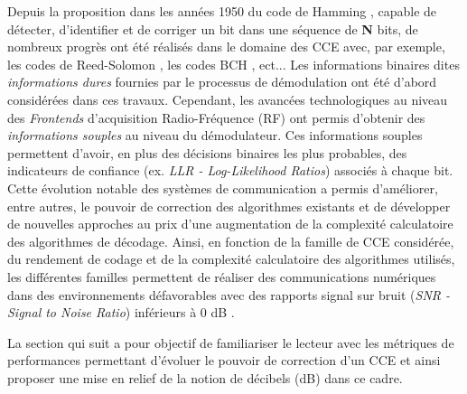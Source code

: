 \documentclass[../main.tex]{subfiles}
\begin{document}
Depuis la proposition dans les années 1950 du code de Hamming \cite{Ham50}, capable de détecter, d’identifier et de corriger un bit dans une séquence de \textbf{N} bits, de nombreux progrès ont été réalisés dans le domaine des CCE avec, par exemple, les codes de Reed-Solomon  \cite{ReedCodes}, les codes BCH  \cite{BCHCode}, ect... Les informations binaires dites \textit{informations dures} fournies par le processus de démodulation ont été d’abord considérées dans ces travaux. Cependant, les avancées technologiques au niveau des \textit{Frontends} d’acquisition Radio-Fréquence (RF) ont permis d'obtenir des \textit{informations souples} au niveau du démodulateur. Ces informations souples permettent d’avoir, en plus des décisions binaires les plus probables, des indicateurs de confiance (ex. \textit{LLR - Log-Likelihood Ratios}) associés à chaque bit.\\
Cette évolution notable des systèmes de communication a permis d’améliorer, entre autres, le pouvoir de correction des algorithmes existants et de développer de nouvelles approches  \cite{BookCodes,BookCom} au prix d’une augmentation de la complexité calculatoire des algorithmes de décodage. Ainsi, en fonction de la famille de CCE considérée, du rendement de codage et de la complexité calculatoire des algorithmes utilisés, les différentes familles permettent de réaliser des communications numériques dans des environnements défavorables avec des rapports signal sur bruit (\textit{SNR - Signal to Noise Ratio}) inférieurs à 0 dB \cite{BookCodes}. 

La section qui suit a pour objectif de familiariser le lecteur avec les métriques de performances permettant d'évoluer le pouvoir de correction d'un CCE et ainsi proposer une mise en relief de la notion de décibels (dB) dans ce cadre. 
\end{document}
